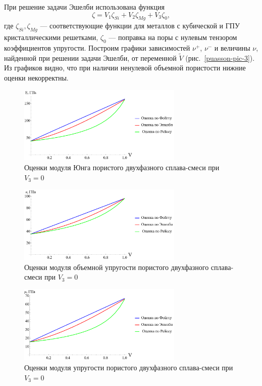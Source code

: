 \documentclass[12pt, a4paper]{article}
\begin{document}
При решение задачи Эшелби использована функция
\[
\zeta = V_1 \zeta_{Si} + V_2 \zeta_{Mg} + V_3 \zeta_0,
\]
где $\zeta_{Si}, \zeta_{Mg}$ --- соответствующие функции для металлов с кубической и ГПУ кристаллическими решетками, $\zeta_0$ --- поправка на поры с нулевым тензором коэффициентов
упругости.
Построим графики зависимостей $\nu^{+}$, $\nu^{-}$ и величины $\nu$, найденной при решении
задачи Эшелби, от переменной $\tilde{V}$ (рис.~\ref{puasson-pic-3}).
Из графиков видно, что при наличии ненулевой объемной пористости нижние оценки некорректны.
\begin{figure}[!htbp]
	\centering
	\includegraphics[width=0.7\textwidth]{e-p-1}%
	\caption{Оценки модуля Юнга пористого двухфазного сплава-смеси при $V_3 = 0$}
	\vspace*{-2mm}
	\label{puasson-pic-p-1}
\end{figure}
\begin{figure}[!htbp]
	\centering
	\includegraphics[width=0.7\textwidth]{k-p-1}%
	\caption{Оценки модуля объемной упругости пористого двухфазного сплава-смеси при $V_3 = 0$}
	\vspace*{-2mm}
	\label{puasson-pic-p-1}
\end{figure}
\begin{figure}[!htbp]
	\centering
	\includegraphics[width=0.7\textwidth]{nu-p-1}%
	\caption{Оценки модуля упругости пористого двухфазного сплава-смеси при $V_3 = 0$}
	\vspace*{-2mm}
	\label{puasson-pic-p-1}
\end{figure}
\end{document}
